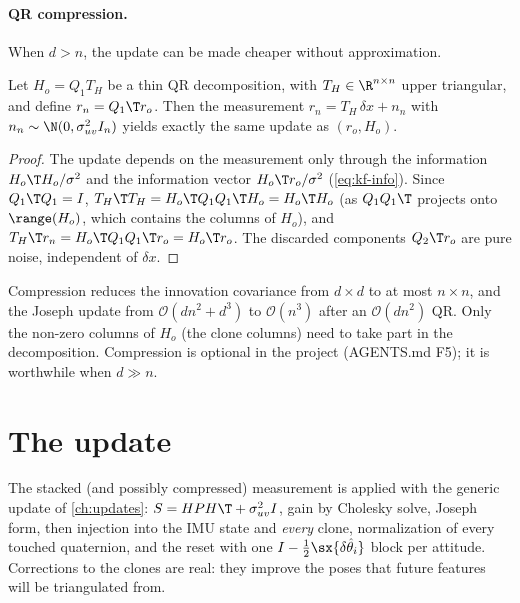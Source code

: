\paragraph{QR compression.} When $d > n$, the update can be made cheaper without approximation.

\begin{proposition}
\label{prop:compression}
Let $H_o = Q_1T_H$ be a thin QR decomposition, with $T_H \in \R^{n\times n}$ upper triangular, and define $r_n = Q_1\T r_o$. Then the
measurement $r_n = T_H\,\delta x + n_n$ with $n_n \sim \N(0, \sigma_{uv}^2I_n)$ yields exactly the same update as $(r_o, H_o)$.
\end{proposition}
\begin{proof}
The update depends on the measurement only through the information $H_o\T H_o/\sigma^2$ and the information vector $H_o\T r_o/\sigma^2$
(\cref{eq:kf-info}). Since $Q_1\T Q_1 = I$, $T_H\T T_H = H_o\T Q_1Q_1\T H_o = H_o\T H_o$ (as $Q_1Q_1\T$ projects onto $\range(H_o)$, which contains
the columns of $H_o$), and $T_H\T r_n = H_o\T Q_1Q_1\T r_o = H_o\T r_o$. The discarded components $Q_2\T r_o$ are pure noise, independent of $\delta x$.
\end{proof}

Compression reduces the innovation covariance from $d\times d$ to at most $n\times n$, and the Joseph update from
$\mathcal{O}(dn^2 + d^3)$ to $\mathcal{O}(n^3)$ after an $\mathcal{O}(dn^2)$ QR. Only the non-zero columns of $H_o$ (the clone columns) need to
take part in the decomposition. Compression is optional in the project (AGENTS.md F5); it is worthwhile when $d \gg n$.

\section{The update}

The stacked (and possibly compressed) measurement is applied with the generic update of \cref{ch:updates}: $S = HPH\T +
\sigma_{uv}^2I$, gain by Cholesky solve, Joseph form, then injection into the IMU state and \emph{every} clone, normalization of every
touched quaternion, and the reset with one $I - \tfrac12\sx{\delta\hat\theta_i}$ block per attitude. Corrections to the clones are
real: they improve the poses that future features will be triangulated from.

